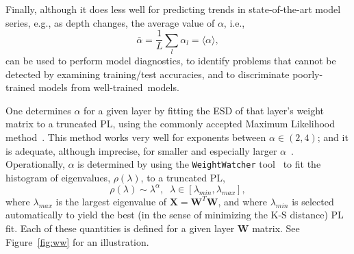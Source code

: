 Finally, although it does less well for predicting trends in state-of-the-art model series, e.g., as depth changes, the average value of $\alpha$, i.e., 
\begin{equation}
\bar{\alpha} = \dfrac{1}{L}\sum_l \alpha_l = \langle\alpha\rangle    ,
\label{eqn:alpha_bar}
\end{equation}
can be used to perform model diagnostics, to identify problems that cannot be detected by examining training/test accuracies, and to discriminate poorly-trained models from well-trained~models.


One determines $\alpha$ for a given layer by fitting the ESD of that layer's weight matrix to a truncated PL, using the commonly accepted Maximum Likelihood method~\cite{CSN09_powerlaw,ABP14}.
This method works very well for exponents between $\alpha\in(2,4)$; and it is adequate, although imprecise, for smaller and especially larger $\alpha$~\cite{newman2005_zipf}. 
%
Operationally, $\alpha$ is determined by using the \texttt{WeightWatcher} tool~\cite{weightwatcher_package} to fit the histogram of eigenvalues, $\rho(\lambda)$, to a truncated PL, 
\begin{equation}
\rho(\lambda)\sim\lambda^{\alpha},\;\;\lambda\in[\lambda_{min},\lambda_{max}] ,
\end{equation}
where $\lambda_{max}$ is the largest eigenvalue of $\mathbf{X}=\mathbf{W}^{T}\mathbf{W}$, and 
where $\lambda_{min}$ is selected automatically to yield the best (in the sense of minimizing the K-S distance) PL fit.
Each of these quantities is defined for a given layer $\mathbf{W}$ matrix.
See Figure~\ref{fig:ww} for an illustration.

